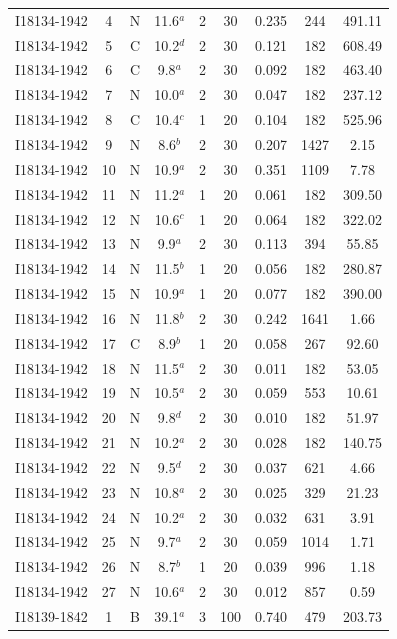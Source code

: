 \begin{table}
\begin{tabular}{ccccccccc}
I18134-1942 & 4 & N & 11.6$^{a}$ & 2 & 30 & 0.235 & 244 & 491.11 \\
I18134-1942 & 5 & C & 10.2$^{d}$ & 2 & 30 & 0.121 & 182 & 608.49 \\
I18134-1942 & 6 & C & 9.8$^{a}$ & 2 & 30 & 0.092 & 182 & 463.40 \\
I18134-1942 & 7 & N & 10.0$^{a}$ & 2 & 30 & 0.047 & 182 & 237.12 \\
I18134-1942 & 8 & C & 10.4$^{c}$ & 1 & 20 & 0.104 & 182 & 525.96 \\
I18134-1942 & 9 & N & 8.6$^{b}$ & 2 & 30 & 0.207 & 1427 & 2.15 \\
I18134-1942 & 10 & N & 10.9$^{a}$ & 2 & 30 & 0.351 & 1109 & 7.78 \\
I18134-1942 & 11 & N & 11.2$^{a}$ & 1 & 20 & 0.061 & 182 & 309.50 \\
I18134-1942 & 12 & N & 10.6$^{c}$ & 1 & 20 & 0.064 & 182 & 322.02 \\
I18134-1942 & 13 & N & 9.9$^{a}$ & 2 & 30 & 0.113 & 394 & 55.85 \\
I18134-1942 & 14 & N & 11.5$^{b}$ & 1 & 20 & 0.056 & 182 & 280.87 \\
I18134-1942 & 15 & N & 10.9$^{a}$ & 1 & 20 & 0.077 & 182 & 390.00 \\
I18134-1942 & 16 & N & 11.8$^{b}$ & 2 & 30 & 0.242 & 1641 & 1.66 \\
I18134-1942 & 17 & C & 8.9$^{b}$ & 1 & 20 & 0.058 & 267 & 92.60 \\
I18134-1942 & 18 & N & 11.5$^{a}$ & 2 & 30 & 0.011 & 182 & 53.05 \\
I18134-1942 & 19 & N & 10.5$^{a}$ & 2 & 30 & 0.059 & 553 & 10.61 \\
I18134-1942 & 20 & N & 9.8$^{d}$ & 2 & 30 & 0.010 & 182 & 51.97 \\
I18134-1942 & 21 & N & 10.2$^{a}$ & 2 & 30 & 0.028 & 182 & 140.75 \\
I18134-1942 & 22 & N & 9.5$^{d}$ & 2 & 30 & 0.037 & 621 & 4.66 \\
I18134-1942 & 23 & N & 10.8$^{a}$ & 2 & 30 & 0.025 & 329 & 21.23 \\
I18134-1942 & 24 & N & 10.2$^{a}$ & 2 & 30 & 0.032 & 631 & 3.91 \\
I18134-1942 & 25 & N & 9.7$^{a}$ & 2 & 30 & 0.059 & 1014 & 1.71 \\
I18134-1942 & 26 & N & 8.7$^{b}$ & 1 & 20 & 0.039 & 996 & 1.18 \\
I18134-1942 & 27 & N & 10.6$^{a}$ & 2 & 30 & 0.012 & 857 & 0.59 \\
I18139-1842 & 1 & B & 39.1$^{a}$ & 3 & 100 & 0.740 & 479 & 203.73 \\

\end{tabular}
\end{table}
